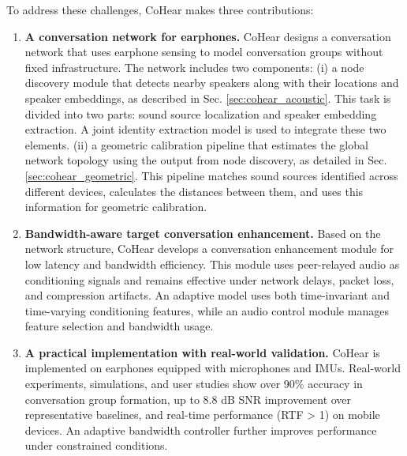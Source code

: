 To address these challenges, CoHear makes three contributions:
\begin{enumerate}
    \item \textbf{A conversation network for earphones.}
    CoHear designs a conversation network that uses earphone sensing to model conversation groups without fixed infrastructure. The network includes two components:
    (i) a node discovery module that detects nearby speakers along with their locations and speaker embeddings, as described in Sec. \ref{sec:cohear_acoustic}. This task is divided into two parts: sound source localization and speaker embedding extraction. A joint identity extraction model is used to integrate these two elements.
    (ii) a geometric calibration pipeline that estimates the global network topology using the output from node discovery, as detailed in Sec. \ref{sec:cohear_geometric}. This pipeline matches sound sources identified across different devices, calculates the distances between them, and uses this information for geometric calibration.

    \item \textbf{Bandwidth-aware target conversation enhancement.}
    Based on the network structure, CoHear develops a conversation enhancement module for low latency and bandwidth efficiency. This module uses peer-relayed audio as conditioning signals and remains effective under network delays, packet loss, and compression artifacts. An adaptive model uses both time-invariant and time-varying conditioning features, while an audio control module manages feature selection and bandwidth usage.

    \item \textbf{A practical implementation with real-world validation.}
    CoHear is implemented on earphones equipped with microphones and IMUs. Real-world experiments, simulations, and user studies show over 90\% accuracy in conversation group formation, up to 8.8 dB SNR improvement over representative baselines, and real-time performance (RTF > 1) on mobile devices. An adaptive bandwidth controller further improves performance under constrained conditions.
\end{enumerate}
